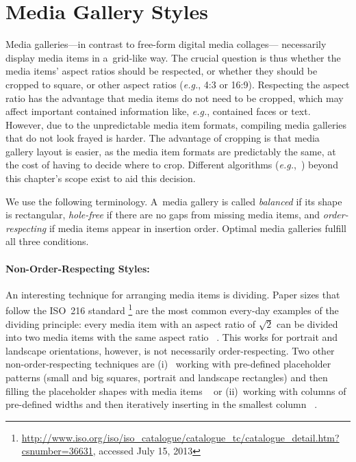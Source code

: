 \section{Media Gallery Styles}
\label{sec:mediagallerystyles}

Media galleries---in contrast to free-form digital media collages---%
necessarily display media items in a~grid-like way.
The crucial question is thus whether the media items' aspect ratios
should be respected, or whether they should be cropped to square,
or other aspect ratios (\emph{e.g.}, 4:3 or 16:9).
Respecting the aspect ratio has the advantage that media items
do not need to be cropped, which may affect important contained information like, \emph{e.g.},
contained faces or text.
However, due to the unpredictable media item formats,
compiling media galleries that do not look frayed is harder.
The advantage of cropping is that media gallery layout is easier,
as the media item formats are predictably the same,
at the cost of having to decide where to crop.
Different algorithms (\emph{e.g.},~\cite{suh2003thumbnail})
beyond this chapter's scope exist to aid this decision.

We use the following terminology.
A~media gallery is called \emph{balanced} if its shape is rectangular,
\emph{hole-free} if there are no gaps from missing media items,
and \emph{order-respecting}
if media items appear in insertion order.
Optimal media galleries fulfill all three conditions.

\paragraph{Non-Order-Respecting Styles:}

An interesting technique for arranging media items is dividing.
Paper sizes that follow the ISO~216 standard%
\footnote{\url{http://www.iso.org/iso/iso_catalogue/catalogue_tc/catalogue_detail.htm?csnumber=36631},
accessed July 15, 2013}
are the most common every-day examples of the dividing principle:
every media item with an aspect ratio of $ \sqrt2 $ can be divided
into two media items with the same aspect ratio%
~\cite{chedeau2012lightboxandroid}.
This works for portrait and landscape orientations,
however, is not necessarily order-respecting.
Two other non-order-respecting techniques are (i)~%
working with pre-defined placeholder patterns
(small and big squares, portrait and landscape rectangles)
and then filling the placeholder shapes with media items%
~\cite{chedeau2012500px}
or (ii)~working with columns of pre-defined widths
and then iteratively inserting in the smallest column%
~\cite{chedeau2012lightbox}.

